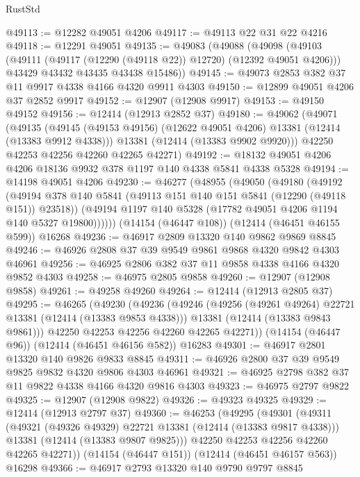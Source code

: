 \begin{lexlean}{RustStd}
\begin{coremodule}
@49113 := @12282 @49051 @4206
@49117 := @49113 @22 @31 @22 @4216
@49118 := @12291 @49051
@49135 := @49083
    (@49088
      (@49098
        (@49103 (@49111 (@49117 (@12290 (@49118 @22)) @12720) (@12392 @49051 @4206)))
        @43429
        @43432
        @43435
        @43438
        @15486))
@49145 := @49073 @2853 @382 @37 @11 @9917 @4338 @4166 @4320 @9911 @4303
@49150 := @12899 @49051 @4206 @37 @2852 @9917
@49152 := @12907 (@12908 @9917)
@49153 := @49150 @49152
@49156 := @12414 (@12913 @2852 @37)
@49180 := @49062
    (@49071
      (@49135
        (@49145 (@49153 @49156) (@12622 @49051 @4206) @13381 (@12414 (@13383 @9912 @4338)))
        @13381
        (@12414 (@13383 @9902 @9920)))
      @42250
      @42253
      @42256
      @42260
      @42265
      @42271)
@49192 := @18132 @49051 @4206 @4206 @18136 @9932 @378 @1197 @140 @4338 @5841 @4338 @5328
@49194 := @14198 @49051 @4206
@49230 := @46277
    (@48955
      (@49050
        (@49180
          (@49192
            (@49194 @378 @140 @5841 (@49113 @151 @140 @151 @5841 (@12290 (@49118 @151)) @23518))
            (@49194 @1197 @140 @5328 (@17782 @49051 @4206 @1194 @140 @5327 @19800))))))
    (@14154 (@46447 @108))
    (@12414 (@46451 @46155 @599))
    @16268
@49236 := @46917 @2809 @13320 @140 @9862 @9869 @8845
@49246 := @46926 @2808 @37 @39 @9549 @9861 @9868 @4320 @9842 @4303 @46961
@49256 := @46925 @2806 @382 @37 @11 @9858 @4338 @4166 @4320 @9852 @4303
@49258 := @46975 @2805 @9858
@49260 := @12907 (@12908 @9858)
@49261 := @49258 @49260
@49264 := @12414 (@12913 @2805 @37)
@49295 := @46265
    (@49230
      (@49236
        (@49246
          (@49256 (@49261 @49264) @22721 @13381 (@12414 (@13383 @9853 @4338)))
          @13381
          (@12414 (@13383 @9843 @9861)))
        @42250
        @42253
        @42256
        @42260
        @42265
        @42271))
    (@14154 (@46447 @96))
    (@12414 (@46451 @46156 @582))
    @16283
@49301 := @46917 @2801 @13320 @140 @9826 @9833 @8845
@49311 := @46926 @2800 @37 @39 @9549 @9825 @9832 @4320 @9806 @4303 @46961
@49321 := @46925 @2798 @382 @37 @11 @9822 @4338 @4166 @4320 @9816 @4303
@49323 := @46975 @2797 @9822
@49325 := @12907 (@12908 @9822)
@49326 := @49323 @49325
@49329 := @12414 (@12913 @2797 @37)
@49360 := @46253
    (@49295
      (@49301
        (@49311
          (@49321 (@49326 @49329) @22721 @13381 (@12414 (@13383 @9817 @4338)))
          @13381
          (@12414 (@13383 @9807 @9825)))
        @42250
        @42253
        @42256
        @42260
        @42265
        @42271))
    (@14154 (@46447 @151))
    (@12414 (@46451 @46157 @563))
    @16298
@49366 := @46917 @2793 @13320 @140 @9790 @9797 @8845

\end{coremodule}
\end{lexlean}
